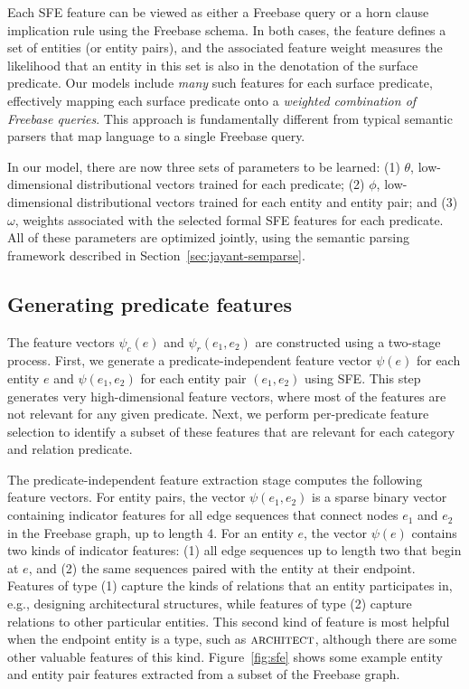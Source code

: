 \documentclass[11pt]{article}
\newcommand{\secref}[1]{Section~\ref{sec:#1}}
\newcommand{\figref}[1]{Figure~\ref{fig:#1}}
\newcommand{\entity}[1]{\ensuremath{\textsc{#1}}}
\begin{document}
Each SFE feature can be viewed as either a Freebase query or a horn
clause implication rule using the Freebase schema. In both cases, the
feature defines a set of entities (or entity pairs), and the
associated feature weight measures the likelihood that an entity in
this set is also in the denotation of the surface predicate. Our
models include \emph{many} such features for each surface predicate,
effectively mapping each surface predicate onto a \emph{weighted
  combination of Freebase queries}. This approach is fundamentally
different from typical semantic parsers that map language to a single
Freebase query.

In our model, there are now three sets of parameters to be learned:
(1) $\theta$, low-dimensional distributional vectors trained for each
predicate; (2) $\phi$, low-dimensional distributional vectors trained
for each entity and entity pair; and (3) $\omega$, weights associated
with the selected formal SFE features for each predicate.  All of
these parameters are optimized jointly, using the semantic parsing
framework described in \secref{jayant-semparse}.

\subsection{Generating predicate features}
\label{sec:feature-generation}

The feature vectors $\psi_c(e)$ and $\psi_r(e_1, e_2)$ are constructed
using a two-stage process. First, we generate a predicate-independent
feature vector $\psi(e)$ for each entity $e$ and $\psi(e_1, e_2)$ for
each entity pair $(e_1, e_2)$ using SFE. This step generates very
high-dimensional feature vectors, where most of the
features are not relevant for any given predicate. Next, we perform
per-predicate feature selection to identify a subset of these features
that are relevant for each category and relation predicate.

The predicate-independent feature extraction stage computes the
following feature vectors. For entity pairs, the vector $\psi(e_1,
e_2)$ is a sparse binary vector containing indicator features for all
edge sequences that connect nodes $e_1$ and $e_2$ in the Freebase
graph, up to length 4.  For an entity $e$, the vector $\psi(e)$
contains two kinds of indicator features: (1) all edge sequences up to
length two that begin at $e$, and (2) the same sequences paired with
the entity at their endpoint. Features of type (1) capture the kinds
of relations that an entity participates in, e.g., designing
architectural structures, while features of type (2) capture relations
to other particular entities. This second kind of feature is most
helpful when the endpoint entity is a type, such as
\entity{architect}, although there are some other valuable features of
this kind. \figref{sfe} shows some example entity and entity pair
features extracted from a subset of the Freebase graph.
\end{document}
